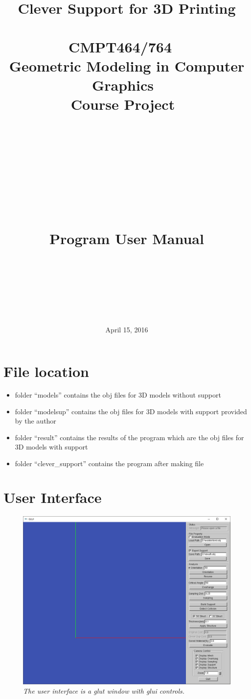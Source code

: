 \documentclass[11pt, a4paper]{article}
\title{\huge\textbf{Clever Support for 3D Printing}\\~\\\large CMPT464/764 ~\\Geometric Modeling in Computer Graphics~\\Course Project~\\~\\~\\~\\~\\~\\~\\\textbf{\Large Program User Manual}}
\date{~\\~\\~\\~\\~\\~\\~\\April 15, 2016}
\begin{document}
    \maketitle
    \thispagestyle{empty}
	\newpage
	\linespread{1}
	\section{File location}
	\begin{itemize}
	\item folder “models” contains the obj files for 3D models without support
	\item folder “modelsup” contains the obj files for 3D models with support provided by the author
	\item folder “result” contains the results of the program which are the obj files for 3D models with support 
	\item folder “clever\_support” contains the program after making file
	\end{itemize}

	\section{User Interface}
	\begin{figure}[H]
  		\centering
      	\includegraphics[width=1.0\textwidth]{UI.png}
  	\caption{\textit{The user interface is a glut window with glui controls.}}
	\end{figure}
\end{document}
